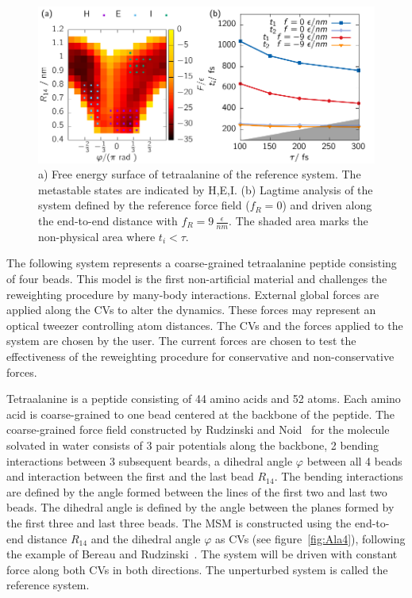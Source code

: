 \begin{figure}
 \centering
 \includegraphics{../plots/Frew/lag_1001.pdf}
 \caption[Free energy surface and lagtime analysis for the two slowest processes of the reference tetraalanine peptide.]{ a) Free energy surface of tetraalanine of the reference system. The metastable states are indicated by H,E,I. (b) Lagtime analysis of the system defined by the reference force field ($f_R=0$) and driven along the end-to-end distance with $f_R = 9\,\frac{\epsilon}{nm}$. The shaded area marks the non-physical area where $t_i < \tau$. }
 \label{fig:AlaLag}
\end{figure}
The following system represents a coarse-grained tetraalanine peptide consisting of four beads.  This model is the first non-artificial material and challenges the reweighting procedure by many-body interactions. External global forces are applied along the CVs to alter the dynamics. These forces may represent an optical tweezer controlling atom distances. The CVs and the forces applied to the system are chosen by the user. The current forces are chosen to test the  effectiveness of the reweighting procedure for conservative and non-conservative forces.

Tetraalanine is a peptide consisting of 44 amino acids and 52 atoms. Each amino acid is coarse-grained to one bead centered at the backbone of the peptide. The coarse-grained force field constructed by Rudzinski and Noid~\cite{rudzinski2015bottom} for the molecule solvated in water consists of 3 pair potentials along the backbone, 2 bending interactions between 3 subsequent beards,  a dihedral angle $\varphi$ between all 4 beads and interaction between the first and the last bead $R_{14}$. The bending interactions are defined by the angle formed between the lines of the first two and last two beads. The dihedral angle is defined by the angle between the planes formed by the first three and last three beads. The MSM is constructed using the end-to-end distance $R_{14}$ and the dihedral angle $\varphi$ as CVs (see figure~\ref{fig:Ala4}), following the example of Bereau and Rudzinski~\cite{bereau2018accurate}. The system will be driven with constant force along both CVs in both directions. The unperturbed system is called the reference system. 
 
